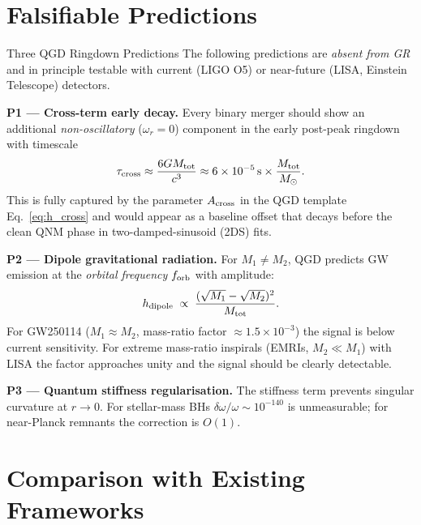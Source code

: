 \documentclass[11pt,a4paper]{article}
\theoremstyle{definition}
\theoremstyle{remark}
\begin{document}
	\section{Falsifiable Predictions}
	\label{sec:predictions}
	
	Three QGD Ringdown Predictions
		The following predictions are \emph{absent from GR} and in principle
		testable with current (LIGO O5) or near-future (LISA, Einstein
		Telescope) detectors.
		
		\medskip
		\noindent\textbf{P1 --- Cross-term early decay.}
		Every binary merger should show an additional \emph{non-oscillatory}
		($\omega_r=0$) component in the early post-peak ringdown with timescale
		\begin{equation}
			\tau_{\rm cross}
			\approx \frac{6GM_{\rm tot}}{c^3}
			\approx 6\times10^{-5}\,{\rm s}\times\frac{M_{\rm tot}}{M_\odot}.
			\label{eq:P1}
		\end{equation}
		This is fully captured by the parameter $A_{\rm cross}$ in the QGD template
		Eq.~\eqref{eq:h_cross} and would appear as a baseline offset that decays
		before the clean QNM phase in two-damped-sinusoid (2DS) fits.
		
		\medskip
		\noindent\textbf{P2 --- Dipole gravitational radiation.}
		For $M_1\neq M_2$, QGD predicts GW emission at the \emph{orbital
			frequency} $f_{\rm orb}$ with amplitude:
		\begin{equation}
			h_{\rm dipole}\;\propto\;
			\frac{(\sqrt{M_1}-\sqrt{M_2})^2}{M_{\rm tot}}.
			\label{eq:P2}
		\end{equation}
		For GW250114 ($M_1\approx M_2$, mass-ratio factor
		$\approx\!1.5\times10^{-3}$) the signal is below current sensitivity.
		For extreme mass-ratio inspirals (EMRIs, $M_2\ll M_1$) with LISA the
		factor approaches unity and the signal should be clearly detectable.
		
		\medskip
		\noindent\textbf{P3 --- Quantum stiffness regularisation.}
		The stiffness term prevents singular curvature at $r\to0$.  For
		stellar-mass BHs $\delta\omega/\omega\sim10^{-140}$ is unmeasurable;
		for near-Planck remnants the correction is $O(1)$.
	
	\section{Comparison with Existing Frameworks}
	\label{sec:comparison}
	
\end{document}
